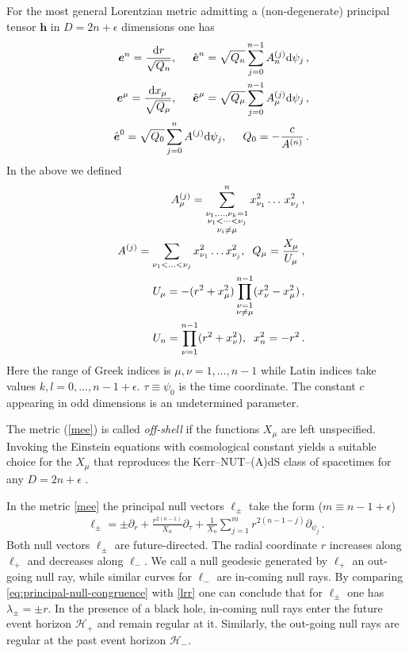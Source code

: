 \documentclass[superscriptaddress,twocolumn,showpacs,
preprintnumbers,amsmath,amssymb,nofootinbib,
longbibliography,aps,prd,10pt]{revtex4-1}
\newcommand{\hh}{,\hspace{0.5cm}}
\newcommand{\hhh}{,\hspace{0.2cm}}
\newcommand{\ts}[1]{{\boldsymbol{#1}}}         %
\newcommand{\dd}{\mbox{d}}
\newcommand{\ba}{\begin{eqnarray}}             %
\newcommand{\ea}{\end{eqnarray}}               %
\begin{document}
For the most general Lorentzian metric admitting a (non-degenerate) principal  tensor $\ts{h}$ in $D = 2n + \epsilon$ dimensions one has \cite{Chen:2006xh,Kubiznak:2008zs,Frolov:2017kze}
\ba
&&\ts{e}^n={\dd r\over \sqrt{Q_n}}\hh \hat{\ts{e}}^n=\sqrt{Q_n}\sum_{j=0}^{n-1} A_n^{(j)} \dd\psi_j\, ,\nonumber\\
&&\ts{e}^{\mu}={\dd x_{\mu}\over \sqrt{Q_{\mu}}}\hh \hat{\ts{e}}^{\mu}=\sqrt{Q_{\mu}}\sum_{j=0}^{n-1}A_{\mu}^{(j)} \dd\psi_j\, ,\nonumber\\
&&\hat{\ts{e}}^0=\sqrt{Q_0}\sum_{j=0}^{n} A^{(j)} \dd\psi_j\hh
Q_0=-{c\over A^{(n)}}\, .
\ea
In the above we defined
\ba
&&A^{(j)}_\mu = \sum\limits_{\substack{\nu_1,\dots,\nu_k=1 \\ \nu_1 < \dots < \nu_j \\\nu_i \not= \mu }}^n x{}_{\nu_1}^2 \dots \, x{}_{\nu_j}^2\, ,\\
&&A^{(j)}=\sum_{\nu_1<\ldots<\nu_j} x_{\nu_1}^2\ldots x_{\nu_j}^2\hhh Q_{\mu}={X_{\mu}\over U_{\mu}}\, ,\\
&& U_{\mu}=-(r^2+x_{\mu}^2)\prod_{\substack{\nu=1 \\ \nu\neq \mu}}^{n-1} (x_{\nu}^2-x_{\mu}^2)\, ,\\
&& U_{n}=\prod_{\nu=1}^{n-1} (r^2+x_{\nu}^2)\hhh x_n^2=-r^2\, .
\ea
Here the range of Greek indices is $\mu,\nu=1,\ldots,n-1$ while Latin indices take values $k,l=0,\ldots,n-1+\epsilon$. $\tau\equiv \psi_0$ is the time coordinate.  The constant $c$ appearing in odd dimensions is an undetermined parameter.

The metric (\ref{mee}) is called \emph{off-shell} if the functions $X{}_\mu$ are left unspecified. Invoking the Einstein equations with cosmological constant yields a suitable choice for the $X_\mu$ that reproduces the Kerr--NUT--(A)dS class of spacetimes for any $D = 2n + \epsilon$ \cite{Frolov:2017kze}.

In the metric \eqref{mee} the principal null vectors $\ts{\ell}_\pm$  take the form \cite{Kubiznak:2008zs} ($m \equiv n - 1 + \epsilon$)
\begin{align}
\label{eq:principal-null-congruence}
\ts{\ell_\pm} = \pm \partial_r + \frac{r^{2(n-1)}}{X_n} \partial_\tau + \frac{1}{X_n} \sum\limits_{j=1}^m r{}^{2(n-1-j)}\partial{}_{\psi_j} \, .
\end{align}
Both null vectors $\ts{\ell}_{\pm}$ are future-directed. The radial coordinate $r$ increases along $\ts{\ell}_+$ and decreases along $\ts{\ell}_-$. We call a null geodesic generated by $\ts{\ell}_+$ an out-going null ray, while  similar curves for $\ts{\ell}_-$ are in-coming null rays. By comparing \eqref{eq:principal-null-congruence} with \eqref{lrr} one can conclude that for $\ts{\ell}_{\pm}$ one has $\lambda_{\pm}=\pm r$. In the presence of a black hole, in-coming null rays enter the future event horizon $\mathcal{H}_+$ and remain regular at it. Similarly, the out-going null rays are regular at the past event horizon $\mathcal{H}_-$.
\end{document}
